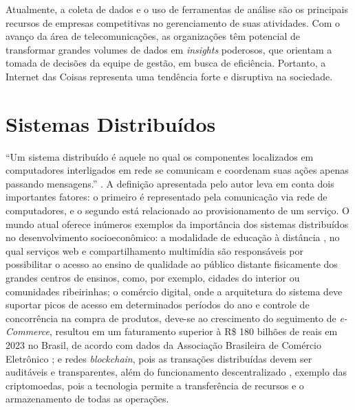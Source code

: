 Atualmente, a coleta de dados e o uso de ferramentas de análise são os principais recursos de empresas competitivas no gerenciamento de suas atividades. Com o 
avanço da área de telecomunicações, as organizações têm potencial de transformar grandes volumes de dados em \textit{insights} poderosos, que orientam a tomada de 
decisões da equipe de gestão, em busca de eficiência. Portanto, a Internet das Coisas representa uma tendência forte e disruptiva na sociedade.

\section{Sistemas Distribuídos}

``Um sistema distribuído é aquele no qual os componentes localizados em computadores interligados em rede se comunicam e coordenam suas ações apenas passando mensagens.'' \cite[pp. 1]{sistemas-distribuidos-coulouris2013}.
A definição apresentada pelo autor leva em conta dois importantes fatores: o primeiro é representado pela comunicação via rede de computadores, e o segundo está relacionado ao provisionamento de um serviço.
O mundo atual oferece inúmeros exemplos da importância dos sistemas distribuídos no desenvolvimento socioeconômico: a modalidade de educação à distância \cite{mec-ead}, no qual serviços web e compartilhamento
multimídia são responsáveis por possibilitar o acesso ao ensino de qualidade ao público distante fisicamente dos grandes centros de ensinos, como, por exemplo, cidades do interior ou comunidades ribeirinhas; o comércio digital, onde a arquitetura do sistema deve suportar picos de acesso em determinados períodos do ano e controle
de concorrência na compra de produtos, deve-se ao crescimento do seguimento de \textit{e-Commerce},
resultou em um faturamento superior à R\$ 180 bilhões de reais em 2023 no Brasil, de acordo com dados da Associação Brasileira de Comércio Eletrônico \cite{abcomm-ecomerce}; e redes \textit{blockchain}, pois as transações distribuídas devem ser auditáveis e transparentes, além do funcionamento descentralizado \cite{juliana-blockchain}, exemplo 
das criptomoedas, pois a tecnologia permite a transferência de recursos e o armazenamento de todas as operações.  

